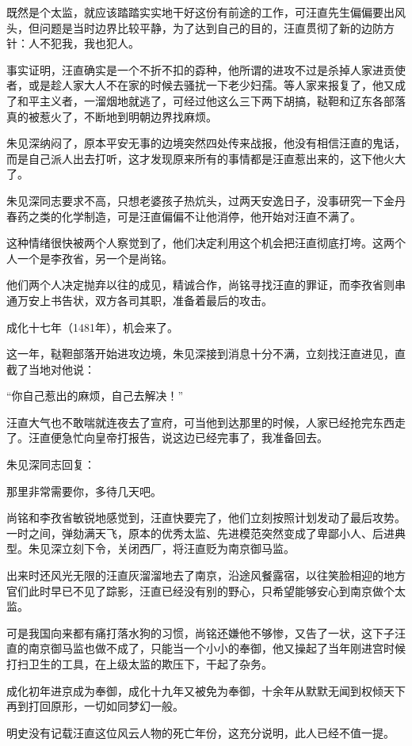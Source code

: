\begin{multicols}{\theparacolNo}
		既然是个太监，就应该踏踏实实地干好这份有前途的工作，可汪直先生偏偏要出风头，但问题是当时边界比较平静，为了达到自己的目的，汪直贯彻了新的边防方针：人不犯我，我也犯人。

		事实证明，汪直确实是一个不折不扣的孬种，他所谓的进攻不过是杀掉人家进贡使者，或是趁人家大人不在家的时候去骚扰一下老少妇孺。等人家来报复了，他又成了和平主义者，一溜烟地就逃了，可经过他这么三下两下胡搞，鞑靼和辽东各部落真的被惹火了，不断地到明朝边界找麻烦。

		朱见深纳闷了，原本平安无事的边境突然四处传来战报，他没有相信汪直的鬼话，而是自己派人出去打听，这才发现原来所有的事情都是汪直惹出来的，这下他火大了。

		朱见深同志要求不高，只想老婆孩子热炕头，过两天安逸日子，没事研究一下金丹春药之类的化学制造，可是汪直偏偏不让他消停，他开始对汪直不满了。

		这种情绪很快被两个人察觉到了，他们决定利用这个机会把汪直彻底打垮。这两个人一个是李孜省，另一个是尚铭。

		他们两个人决定抛弃以往的成见，精诚合作，尚铭寻找汪直的罪证，而李孜省则串通万安上书告状，双方各司其职，准备着最后的攻击。

		成化十七年（1481年），机会来了。

		这一年，鞑靼部落开始进攻边境，朱见深接到消息十分不满，立刻找汪直进见，直截了当地对他说：

		“你自己惹出的麻烦，自己去解决！”

		汪直大气也不敢喘就连夜去了宣府，可当他到达那里的时候，人家已经抢完东西走了。汪直便急忙向皇帝打报告，说这边已经完事了，我准备回去。

		朱见深同志回复：

		那里非常需要你，多待几天吧。

		尚铭和李孜省敏锐地感觉到，汪直快要完了，他们立刻按照计划发动了最后攻势。一时之间，弹劾满天飞，原本的优秀太监、先进模范突然变成了卑鄙小人、后进典型。朱见深立刻下令，关闭西厂，将汪直贬为南京御马监。

		出来时还风光无限的汪直灰溜溜地去了南京，沿途风餐露宿，以往笑脸相迎的地方官们此时早已不见了踪影，汪直已经没有别的野心，只希望能够安心到南京做个太监。

		可是我国向来都有痛打落水狗的习惯，尚铭还嫌他不够惨，又告了一状，这下子汪直的南京御马监也做不成了，只能当一个小小的奉御，他又操起了当年刚进宫时候打扫卫生的工具，在上级太监的欺压下，干起了杂务。

		成化初年进京成为奉御，成化十九年又被免为奉御，十余年从默默无闻到权倾天下再到打回原形，一切如同梦幻一般。

		明史没有记载汪直这位风云人物的死亡年份，这充分说明，此人已经不值一提。


\end{multicols}
